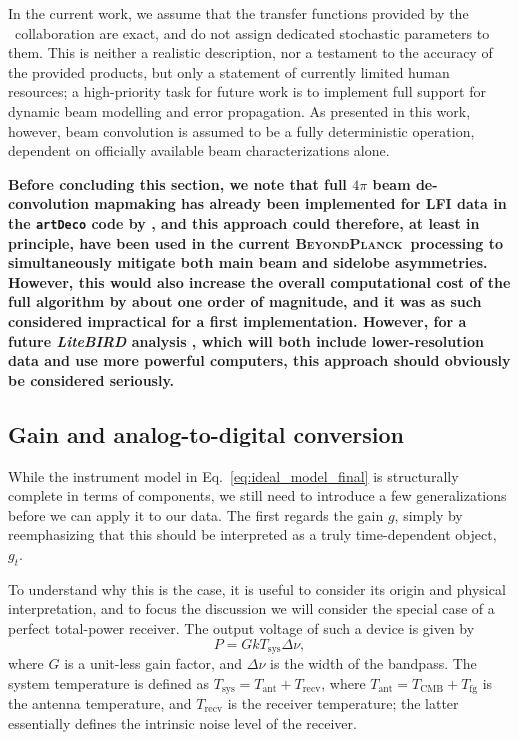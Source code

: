 \documentclass[twocolumn]{aa}
\newcommand{\BP}{\textsc{BeyondPlanck}}
\begin{document}
In the current work, we assume that the transfer functions provided by
the \Planck\ collaboration are exact, and do not assign dedicated
stochastic parameters to them. This is neither a realistic description, 
nor a testament to the accuracy of the provided
products, but only a statement of currently limited human resources; a
high-priority task for future work is to implement full support for
dynamic beam modelling and error propagation. As presented in this
work, however, beam convolution is assumed to be a fully deterministic
operation, dependent on officially available beam characterizations
alone.

{\bf Before concluding this section, we note that full $4\pi$ beam
  de-convolution mapmaking has already been implemented for LFI data
  in the \texttt{artDeco} code by \citet{keihanen2012}, and this approach could
  therefore, at least in principle, have been used in the current
  \BP\ processing to simultaneously mitigate both main beam and
  sidelobe asymmetries. However, this would also increase the overall
  computational cost of the full algorithm by about one order of
  magnitude, and it was as such considered impractical for a first
  implementation. However, for a future \textit{LiteBIRD} analysis
  \citep{ptep}, which will both include lower-resolution data and use
  more powerful computers, this approach should obviously be
  considered seriously.}


\subsection{Gain and analog-to-digital conversion}
\label{sec:gain}

While the instrument model in Eq.~\eqref{eq:ideal_model_final} is
structurally complete in terms of components, we still need to
introduce a few generalizations before we can apply it to our
data. The first regards the gain $g$, simply by reemphasizing that
this should be interpreted as a truly time-dependent object, $g_t$.

To understand why this is the case, it is useful to consider its
origin and physical interpretation, and to focus the discussion we
will consider the special case of a perfect total-power receiver. The
output voltage of such a device is given by
\begin{equation}
  P = GkT_{\mathrm{sys}}\Delta\nu,
  \label{eq:power}
\end{equation}
where $G$ is a unit-less gain factor, and $\Delta\nu$ is the width of
the bandpass. The system temperature is defined as
$T_{\mathrm{sys}}=T_{\mathrm{ant}}+T_{\mathrm{recv}}$, where
$T_{\mathrm{ant}}=T_{\mathrm{CMB}} + T_{\mathrm{fg}}$ is the antenna temperature,
and $T_{\mathrm{recv}}$ is the receiver temperature; the latter
essentially defines the intrinsic noise level of the receiver.
\end{document}
